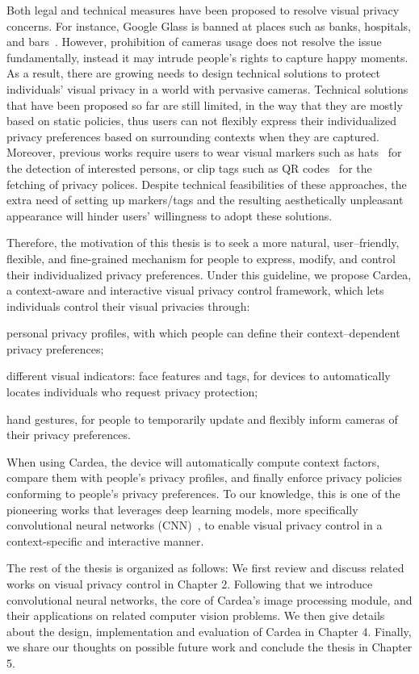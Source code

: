 Both legal and technical measures have been proposed to resolve visual privacy concerns. For instance, Google Glass is banned at places such as banks, hospitals, and bars~\cite{links:glassbanned}. However, prohibition of cameras usage does not resolve the issue fundamentally, instead it may intrude people's rights to capture happy moments. As a result, there are growing needs to design technical solutions to protect individuals' visual privacy in a world with pervasive cameras. Technical solutions that have been proposed so far are still limited, in the way that they are mostly based on static policies, thus users can not flexibly express their individualized privacy preferences based on surrounding contexts when they are captured. Moreover, previous works require users to wear visual markers such as hats~\cite{schiff2009respectful} for the detection of interested persons, or clip tags such as QR codes~\cite{bo2014privacy,roesner2014world} for the fetching of privacy polices. Despite technical feasibilities of these approaches, the extra need of setting up markers/tags and the resulting aesthetically unpleasant appearance will hinder users' willingness to adopt these solutions.

Therefore, the motivation of this thesis is to seek a more natural, user–friendly, flexible, and fine-grained mechanism for people to express, modify, and control their individualized privacy preferences. Under this guideline, we propose Cardea, a context-aware and interactive visual privacy control framework, which lets individuals control their visual privacies through:
\begin{inparaenum}
\item personal privacy profiles, with which people can define their context–dependent privacy preferences;
\item different visual indicators: face features and tags, for devices to automatically locates individuals who request privacy protection;
\item hand gestures, for people to temporarily update and flexibly inform cameras of their privacy preferences.
\end{inparaenum}
When using Cardea, the device will automatically compute context factors, compare them with people’s privacy profiles, and finally enforce privacy policies conforming to people’s privacy preferences. To our knowledge, this is one of the pioneering works that leverages deep learning models, more specifically convolutional neural networks (CNN)~\cite{lecun1998gradient}, to enable visual privacy control in a context-specific and interactive manner.

The rest of the thesis is organized as follows: We first review and discuss related works on visual privacy control in Chapter 2. Following that we introduce convolutional neural networks, the core of Cardea's image processing module, and their applications on related computer vision problems. We then give details about the design, implementation and evaluation of Cardea in Chapter 4. Finally, we share our thoughts on possible future work and conclude the thesis in Chapter 5.

\newpage
